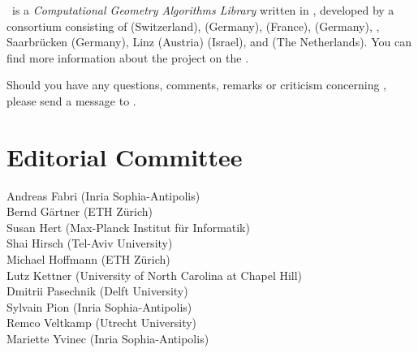 

\cgal\ is a {\em Computational Geometry Algorithms Library} written in \CC, 
developed by a consortium consisting of
 (Switzerland), 
 (Germany), 
 (France),
 (Germany),
,
Saarbr\"ucken (Germany),
 Linz (Austria)
 (Israel), and
 (The Netherlands). 
You can find more information about the project on the 
.

Should you have any questions, comments, remarks or criticism concerning 
\cgal, please send a message to 
.


\section*{Editorial Committee}

Andreas Fabri ({\sc Inria} Sophia-Antipolis) \\
Bernd G\"artner (ETH Z\"urich) \\
Susan Hert (Max-Planck Institut f\"ur Informatik)\\
Shai Hirsch (Tel-Aviv University) \\
Michael Hoffmann (ETH Z\"urich) \\
Lutz Kettner (University of North Carolina at Chapel Hill) \\
Dmitrii Pasechnik (Delft University) \\
Sylvain Pion ({\sc Inria} Sophia-Antipolis)\\
Remco Veltkamp (Utrecht University)\\
Mariette Yvinec ({\sc Inria} Sophia-Antipolis)\\



